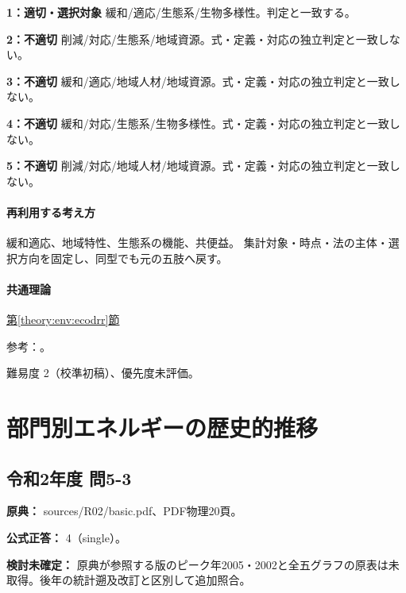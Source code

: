 \noindent\textbf{1：適切・選択対象} 緩和/適応/生態系/生物多様性。判定と一致する。\par

\noindent\textbf{2：不適切} 削減/対応/生態系/地域資源。式・定義・対応の独立判定と一致しない。\par

\noindent\textbf{3：不適切} 緩和/適応/地域人材/地域資源。式・定義・対応の独立判定と一致しない。\par

\noindent\textbf{4：不適切} 緩和/対応/生態系/生物多様性。式・定義・対応の独立判定と一致しない。\par

\noindent\textbf{5：不適切} 削減/対応/地域人材/地域資源。式・定義・対応の独立判定と一致しない。\par

\paragraph{再利用する考え方} 緩和適応、地域特性、生態系の機能、共便益。 集計対象・時点・法の主体・選択方向を固定し、同型でも元の五肢へ戻す。

\paragraph{共通理論} \hyperref[theory:env:ecodrr]{第\ref*{theory:env:ecodrr}節}

\par 参考：\cite{env59_ecodrr}。

\par 難易度 2（校準初稿）、優先度未評価。

\section{部門別エネルギーの歴史的推移}

\subsection{令和2年度 問5-3}
\label{q:r02-reg-basic-5-3}

\noindent\textbf{原典：} sources/R02/basic.pdf、PDF物理20頁。

\textbf{公式正答：} 4（single）。

\par\textbf{検討未確定：} 原典が参照する版のピーク年2005・2002と全五グラフの原表は未取得。後年の統計遡及改訂と区別して追加照合。

